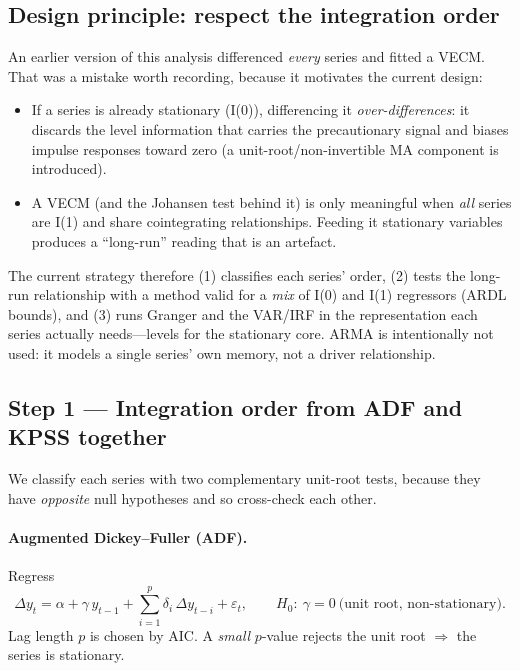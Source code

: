 \documentclass[11pt,a4paper]{article}
\begin{document}
\subsection{Design principle: respect the integration order}
An earlier version of this analysis differenced \emph{every} series and fitted a
VECM. That was a mistake worth recording, because it motivates the current
design:
\begin{itemize}
  \item If a series is already stationary (I(0)), differencing it
  \emph{over-differences}: it discards the level information that carries the
  precautionary signal and biases impulse responses toward zero (a
  unit-root/non-invertible MA component is introduced).
  \item A VECM (and the Johansen test behind it) is only meaningful when
  \emph{all} series are I(1) and share cointegrating relationships. Feeding it
  stationary variables produces a ``long-run'' reading that is an artefact.
\end{itemize}
The current strategy therefore (1) classifies each series' order, (2) tests the
long-run relationship with a method valid for a \emph{mix} of I(0) and I(1)
regressors (ARDL bounds), and (3) runs Granger and the VAR/IRF in the
representation each series actually needs---levels for the stationary core. ARMA
is intentionally not used: it models a single series' own memory, not a
driver relationship.

\subsection{Step 1 --- Integration order from ADF and KPSS together}
We classify each series with two complementary unit-root tests, because they
have \emph{opposite} null hypotheses and so cross-check each other.

\paragraph{Augmented Dickey--Fuller (ADF).} Regress
\begin{equation}
  \Delta y_t = \alpha + \gamma\,y_{t-1}
             + \sum_{i=1}^{p}\delta_i\,\Delta y_{t-i} + \varepsilon_t,
  \qquad H_0:\ \gamma = 0\ \text{(unit root, non-stationary)} .
\end{equation}
Lag length $p$ is chosen by AIC. A \emph{small} $p$-value rejects the unit root
$\Rightarrow$ the series is stationary.
\end{document}
